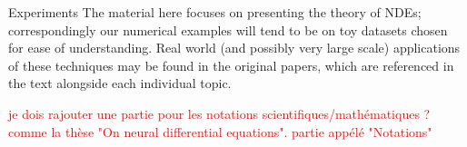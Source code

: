 Experiments The material here focuses on presenting the theory of NDEs; correspondingly
our numerical examples will tend to be on toy datasets chosen for ease of
understanding. Real world (and possibly very large scale) applications of these techniques
may be found in the original papers, which are referenced in the text alongside
each individual topic.


\textcolor{red}{je dois rajouter une partie pour les notations scientifiques/mathématiques ? comme la thèse "On neural differential equations". partie appélé "Notations"}
